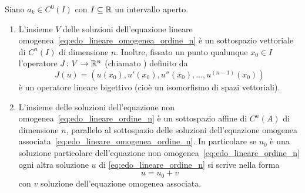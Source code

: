 \begin{theorem}%
\label{th:edo_lineare_ordine_n}%
\mymark{***}%
Siano $a_k\in C^0(I)$ con $I\subseteq \mathbb R$
un intervallo aperto.

\begin{enumerate}
\item
L'insieme $V$ delle soluzioni dell'equazione lineare omogenea~\eqref{eq:edo_lineare_omogenea_ordine_n}
è un sottospazio vettoriale di $C^n(I)$ di dimensione $n$.
Inoltre, fissato un punto qualunque $x_0\in I$ l'operatore $J\colon V \to \mathbb R^n$
(chiamato ) definito da
\begin{equation}\label{eq:jet}
  J(u) = (u(x_0), u'(x_0), u''(x_0), \dots, u^{(n-1)}(x_0))
\end{equation}
è un operatore lineare bigettivo (cioè un isomorfismo di spazi vettoriali).

\item
L'insieme delle soluzioni dell'equazione non omogenea~\eqref{eq:edo_lineare_ordine_n}
è un sottospazio affine di $C^n(A)$ di dimensione $n$,
parallelo al sottospazio delle soluzioni dell'equazione omogenea
associata~\eqref{eq:edo_lineare_omogenea_ordine_n}.
In particolare se $u_0$ è una soluzione particolare dell'equazione non
omogenea~\eqref{eq:edo_lineare_ordine_n} ogni altra soluzione $u$ di
\eqref{eq:edo_lineare_ordine_n} si scrive nella forma
\[
  u = u_0 + v
\]
con $v$ soluzione dell'equazione omogenea associata.
\end{enumerate}
\end{theorem}
%
